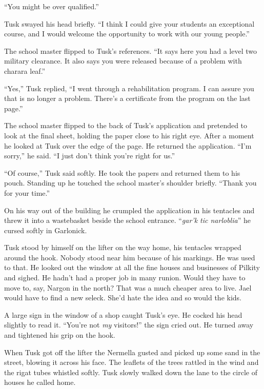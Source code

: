 ``You might be over qualified.''

Tusk swayed his head briefly. ``I think I could give your students an exceptional course, and I
would welcome the opportunity to work with our young people.''

The school master flipped to Tusk's references. ``It says here you had a level two military
clearance. It also says you were released because of a problem with charara leaf.''

``Yes,'' Tusk replied, ``I went through a rehabilitation program. I can assure you that is no
longer a problem. There's a certificate from the program on the last page.''

The school master flipped to the back of Tusk's application and pretended to look at the final
sheet, holding the paper close to his right eye. After a moment he looked at Tusk over the edge
of the page. He returned the application. ``I'm sorry,'' he said. ``I just don't think you're
right for us.''

``Of course,'' Tusk said softly. He took the papers and returned them to his pouch. Standing up
he touched the school master's shoulder briefly. ``Thank you for your time.''

On his way out of the building he crumpled the application in his tentacles and threw it into a
wastebasket beside the school entrance. ``\textit{gar'k tic narloblia}'' he cursed softly in
Garlonick.

Tusk stood by himself on the lifter on the way home, his tentacles wrapped around the hook.
Nobody stood near him because of his markings. He was used to that. He looked out the window at
all the fine houses and businesses of Pilkity and sighed. He hadn't had a proper job in many
runion. Would they have to move to, say, Nargon in the north? That was a much cheaper area to
live. Jael would have to find a new seleck. She'd hate the idea and so would the kids.


A large sign in the window of a shop caught Tusk's eye. He cocked his head slightly to read it.
``You're not \emph{my} visitors!'' the sign cried out. He turned away and tightened his grip on
the hook.

When Tusk got off the lifter the Nermella gusted and picked up some sand in the street, blowing
it across his face. The leaflets of the trees rattled in the wind and the rigat tubes whistled
softly. Tusk slowly walked down the lane to the circle of houses he called home.

